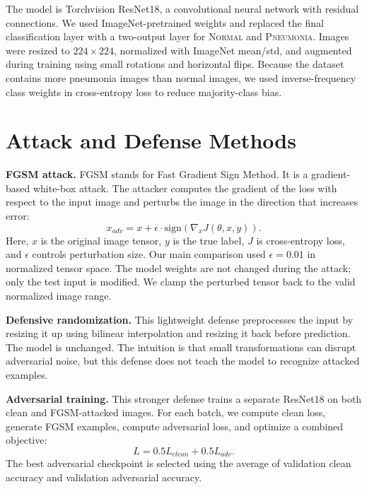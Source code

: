 ﻿\documentclass[10pt]{article}
\begin{document}
The model is Torchvision ResNet18, a convolutional neural network with residual connections. We used ImageNet-pretrained weights and replaced the final classification layer with a two-output layer for \textsc{Normal} and \textsc{Pneumonia}. Images were resized to $224 \times 224$, normalized with ImageNet mean/std, and augmented during training using small rotations and horizontal flips. Because the dataset contains more pneumonia images than normal images, we used inverse-frequency class weights in cross-entropy loss to reduce majority-class bias.

\section{Attack and Defense Methods}
\textbf{FGSM attack.} FGSM stands for Fast Gradient Sign Method. It is a gradient-based white-box attack. The attacker computes the gradient of the loss with respect to the input image and perturbs the image in the direction that increases error:
\[
    x_{adv} = x + \epsilon \cdot \mathrm{sign}(\nabla_x J(\theta, x, y)).
\]
Here, $x$ is the original image tensor, $y$ is the true label, $J$ is cross-entropy loss, and $\epsilon$ controls perturbation size. Our main comparison used $\epsilon=0.01$ in normalized tensor space. The model weights are not changed during the attack; only the test input is modified. We clamp the perturbed tensor back to the valid normalized image range.

\textbf{Defensive randomization.} This lightweight defense preprocesses the input by resizing it up using bilinear interpolation and resizing it back before prediction. The model is unchanged. The intuition is that small transformations can disrupt adversarial noise, but this defense does not teach the model to recognize attacked examples.

\textbf{Adversarial training.} This stronger defense trains a separate ResNet18 on both clean and FGSM-attacked images. For each batch, we compute clean loss, generate FGSM examples, compute adversarial loss, and optimize a combined objective:
\[
    L = 0.5L_{clean} + 0.5L_{adv}.
\]
The best adversarial checkpoint is selected using the average of validation clean accuracy and validation adversarial accuracy.
\end{document}

